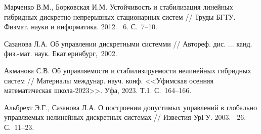 \begin{thebibliography}{9} %
 Марченко В.М., Борковская И.М. Устойчивость и стабилизация линейных гибридных дискретно-непрерывных стационарных систем // Труды БГТУ. Физмат. науки и информатика. 2012. \textnumero~6.
С.~7--10. 

 Сазанова Л.А. Об управлении дискретными  системми //   Автореф. дис. ... канд. физ.-мат. наук. Екат.еринбург,~2002.

 
 Акманова С.В. Об управляемости и стабилизируемости нелинейных гибридных систем // Материалы междунар. науч. конф.
<<Уфимская осенняя математическая школа-2023>>. Уфа, 2023. Т.1.  С.~164--166.

Альбрехт Э.Г., Сазанова Л.А. О построении допустимых управлений  в глобально управляемых  нелинейных дискретных системах // Известия УрГУ. 2003. \textnumero~26. С.~11--23. 

\end{thebibliography}







%